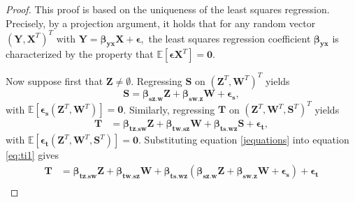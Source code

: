\documentclass[11pt,a4paper]{article}
\theoremstyle{definition}
\theoremstyle{remark}
\begin{document}
\begin{proof}%
%	
This proof is based on the uniqueness of the least squares regression. Precisely, by a projection argument, it holds that for any random vector $(\mathbf{Y},\mathbf{X}^T)^T$ with
$\mathbf{Y}=\boldsymbol{\beta}_{\mathbf{yx}} \mathbf{X} + \boldsymbol{\epsilon},$
the least squares regression coefficient $\boldsymbol{\beta}_{\mathbf{yx}}$ is characterized by the property that $\mathbb{E}[\boldsymbol{\epsilon} \mathbf{X}^T] = \boldsymbol{0}$.


Now suppose first that $\mathbf{Z} \neq \emptyset$. Regressing $\mathbf{S}$ on $(\mathbf{Z}^T,\mathbf{W}^T)^T$ yields
\begin{equation}
\mathbf{S} = \boldsymbol{\beta}_{\mathbf{sz}.\mathbf{w}} {\mathbf{Z}} 
+ \boldsymbol{\beta}_{\mathbf{sw}.\mathbf{z}} {\mathbf{W}} 
+ \boldsymbol{\epsilon}_{\mathbf{s}},
\label{jequations}
\end{equation}
with $\mathbb{E}[\boldsymbol{\epsilon}_{\mathbf{s}} (\mathbf{Z}^T,\mathbf{W}^T)] = \boldsymbol{0}$. 
Similarly, regressing $\mathbf{T}$ on $(\mathbf{Z}^T,\mathbf{W}^T,\mathbf{S}^T)^T$ yields
\begin{align}
\mathbf{T} &= \boldsymbol{\beta}_{\mathbf{tz}.\mathbf{s}\mathbf{w}} \mathbf{Z} +
\boldsymbol{\beta}_{\mathbf{tw}.\mathbf{s}\mathbf{z}} \mathbf{W} +
\boldsymbol{\beta}_{\mathbf{ts}.\mathbf{w}\mathbf{z}} \mathbf{S} + \boldsymbol{\epsilon}_{\mathbf{t}},  \label{eq:ti1}
\end{align}
with $\mathbb{E}[\boldsymbol{\epsilon}_{\mathbf{t}} (\mathbf{Z}^T,\mathbf{W}^T,\mathbf{S}^T)] = \boldsymbol{0}$. 
Substituting equation \eqref{jequations} into equation \eqref{eq:ti1} gives
\begin{align}
\mathbf{T} &= \boldsymbol{\beta}_{\mathbf{tz}.\mathbf{s}\mathbf{w}} \mathbf{Z} + 
\boldsymbol{\beta}_{\mathbf{tw}.\mathbf{s}\mathbf{z}} \mathbf{W}
+ \boldsymbol{\beta}_{\mathbf{ts}.\mathbf{w}\mathbf{z}} (\boldsymbol{\beta}_{\mathbf{s}\mathbf{z}.\mathbf{w}} \mathbf{Z} + \boldsymbol{\beta}_{\mathbf{s}\mathbf{w}.\mathbf{z}} \mathbf{W} + \boldsymbol{\epsilon}_{\mathbf{s}}) + \boldsymbol{\epsilon}_{\mathbf{t}} \nonumber\\

\end{align}
\end{proof}
\end{document}
